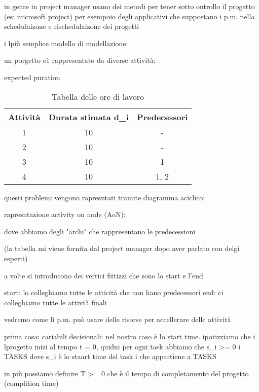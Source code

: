 in genre in project manager usano dei metodi per tener sotto ontrollo il progetto (es: microsoft project) per esempoio degli applicativi che suppostano i p.m. nella schedulaizone e rischedulaizone dei progetti 



i lpiù semplice modello di modellazione:

un porgetto e1 rappresentato da diverse attività:

expected puration




\begin{table}[h!]
	\begin{center}
	\begin{tabular}{|c | c c |} 
			\hline
			Attività & Durata stimata d_i & Predecessori \\ [0.5ex]
			\hline
 			1 & 10 & - \\
			2 & 10 & - \\
			3 & 10 & 1 \\
			4 & 10 & 1, 2 \\
			\hline
		\end{tabular}
	\end{center}
	\caption{Tabella delle ore di lavoro}
	\label{taborelav}
\end{table}


questi problemi vengono rapresntati tramite diagramma aciclico:

rapresntazione activity on node (AoN):

dove abbiamo degli "archi" che rappresentano le predecessioni 

(la tabella mi viene fornita dal project manager dopo aver parlato con delgi esperti)



a volte si introducono dei vertici fittizzi che sono lo start e l'end

start: lo colleghiamo tutte le atticità che non hano predecessori
end: ci colleghiamo tutte le attivtà finali




vedremo come li p.m. può usare delle risorse per accellerare delle attività


prima cosa: cariabili decisionali: nel nostro caso è lo start time. ipotizziamo che i lprogetto inizi al tempo t = 0, quidni per ogni task abbiamo che s_i >= 0 \forall i \in TASKS dove s_i è lo staart time del task i che appartiene a TASKS

in più possiamo definire T >= 0 che è il tempo di completamento del progetto (complition time)


